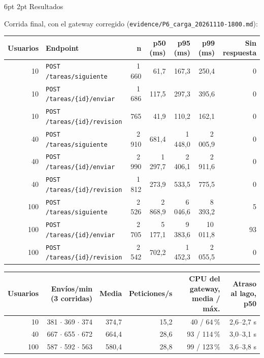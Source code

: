 \documentclass[10pt,letterpaper]{article}
\makeatletter
\newcommand{\ev}[1]{{\footnotesize\texttt{evidence/\allowbreak #1}}}
\renewcommand\subsection{\@startsection{subsection}{2}{\z@}%
  {6pt \@plus 1pt}{2pt}%
  {\normalfont\normalsize\bfseries\color{acc}}}
\makeatother
\begin{document}
\subsection{Resultados}

Corrida final, con el gateway corregido (\ev{P6\_carga\_20261110-1800.md}):

\begin{center}\small
\begin{tabular}{@{}rlrrrrr@{}}
\toprule
Usuarios & Endpoint & n & p50 (ms) & p95 (ms) & p99 (ms) & Sin respuesta \\
\midrule
10 & \texttt{POST /tareas/siguiente} & 1\,660 & 61,7 & 167,3 & 250,4 & 0 \\
10 & \texttt{POST /tareas/\{id\}/enviar} & 1\,686 & 117,5 & 297,3 & 395,6 & 0 \\
10 & \texttt{POST /tareas/\{id\}/revision} & 765 & 41,9 & 110,2 & 162,1 & 0 \\
\midrule
40 & \texttt{POST /tareas/siguiente} & 2\,910 & 681,4 & 1\,448,0 & 2\,005,9 & 0 \\
40 & \texttt{POST /tareas/\{id\}/enviar} & 2\,990 & 1\,297,7 & 2\,406,1 & 2\,911,6 & 0 \\
40 & \texttt{POST /tareas/\{id\}/revision} & 1\,812 & 273,9 & 533,5 & 775,5 & 0 \\
\midrule
100 & \texttt{POST /tareas/siguiente} & 2\,526 & 2\,868,9 & 6\,046,6 & 8\,393,2 & 5 \\
100 & \texttt{POST /tareas/\{id\}/enviar} & 2\,705 & 5\,177,1 & 9\,383,6 & 10\,011,8 & 93 \\
100 & \texttt{POST /tareas/\{id\}/revision} & 2\,542 & 702,2 & 1\,452,3 & 2\,055,5 & 0 \\
\bottomrule
\end{tabular}

\vspace{4pt}
\begin{tabular}{@{}rrrrrr@{}}
\toprule
Usuarios & Envíos/min (3 corridas) & Media & Peticiones/s & CPU del gateway, media / máx. & Atraso al lago, p50 \\
\midrule
10 & 381 $\cdot$ 369 $\cdot$ 374 & 374,7 & 15,2 & 40 / 64\,\% & 2,6--2,7 s \\
40 & 667 $\cdot$ 655 $\cdot$ 672 & 664,4 & 28,6 & 93 / 114\,\% & 3,0--3,1 s \\
100 & 587 $\cdot$ 592 $\cdot$ 563 & 580,4 & 28,8 & 99 / 123\,\% & 3,6--3,8 s \\
\bottomrule
\end{tabular}
\end{center}
\end{document}
